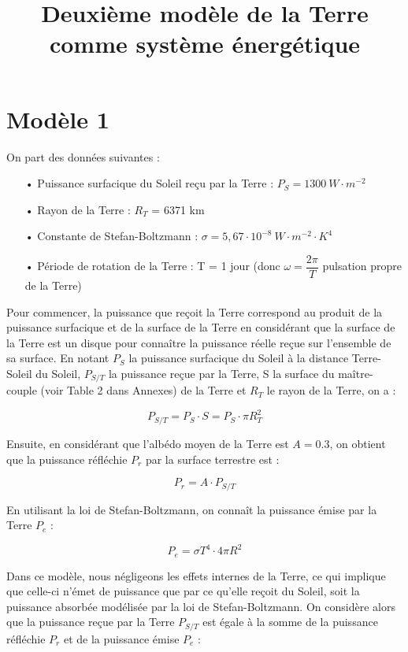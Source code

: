 \documentclass[a4paper,11pt]{article}
\title{Deuxième modèle de la Terre comme système énergétique}
\begin{document}
\maketitle

\section{Modèle 1}

On part des données suivantes :

\begin{enumerate}

\item[•] Puissance surfacique du Soleil reçu par la Terre : $P_S = 1300 ~ W \cdot m^{-2}$
\item[•] Rayon de la Terre : $R_T$ = 6371 km
\item[•] Constante de Stefan-Boltzmann : $\sigma = 5,67 \cdot 10^{-8} ~ W \cdot m^{-2} \cdot K^4$ 
\item[•] Période de rotation de la Terre : T = 1 jour (donc $\omega = \dfrac{2\pi}{T}$ pulsation propre de la Terre)

\end{enumerate}

Pour commencer, la puissance que reçoit la Terre correspond au produit de la puissance surfacique et de la surface de la Terre en considérant que la surface de la Terre est un disque pour connaître la puissance réelle reçue sur l'ensemble de sa surface. En notant $P_S$ la puissance surfacique du Soleil à la distance Terre-Soleil du Soleil, $P_{S/T}$ la puissance reçue par la Terre, S la surface du maître-couple (voir Table 2 dans Annexes) de la Terre et $R_T$ le rayon de la Terre, on a :

\[ P_{S/T} = P_S \cdot S = P_S \cdot \pi R_T^2  \]

Ensuite, en considérant que l'albédo moyen de la Terre est $A = 0.3$, on obtient que la puissance réfléchie $P_r$ par la surface terrestre est :

\[ P_r = A \cdot P_{S/T} \]

En utilisant la loi de Stefan-Boltzmann, on connaît la puissance émise par la Terre $P_e$ :

\[ P_e = \sigma T^4 \cdot 4 \pi R^2 \]

Dans ce modèle, nous négligeons les effets internes de la Terre, ce qui implique que celle-ci n'émet de puissance que par ce qu'elle reçoit du Soleil, soit la puissance absorbée modélisée par la loi de Stefan-Boltzmann. On considère alors que la puissance reçue par la Terre $P_{S/T}$ est égale à la somme de la puissance réfléchie $P_r$ et de la puissance émise $P_e$ :
\end{document}

